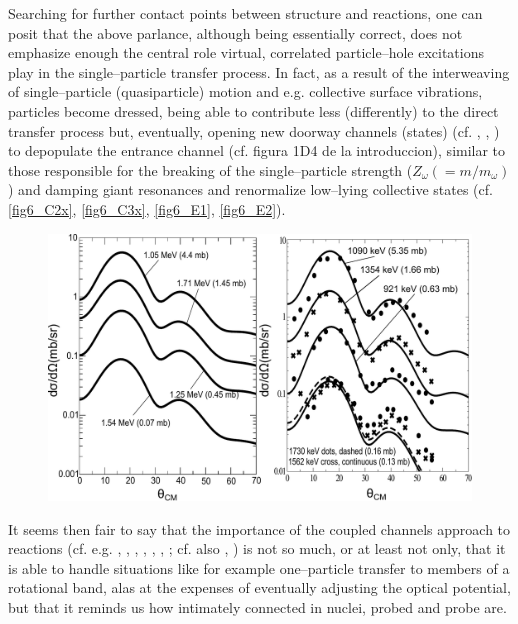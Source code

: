 \documentclass[a4paper,11pt]{book}
\numberwithin{equation}{section}
\numberwithin{figure}{section}
\numberwithin{table}{section}
\begin{document}
Searching for further contact points between structure and reactions, one can posit that the above parlance, although being essentially correct, does not emphasize enough the central role virtual, correlated particle--hole excitations play in the single--particle transfer process. In fact, as a result of the interweaving of single--particle (quasiparticle) motion and e.g. collective surface vibrations, particles become dressed, being able to contribute less (differently) to the direct transfer process but, eventually, opening new doorway channels (states) (cf. \cite{Feshbach:58}, \cite{Rawitscher:87}, \cite{Bortignon:81b}) to depopulate the entrance channel (cf. figura 1D4 de la introduccion), similar to those responsible for the breaking of the single--particle strength ($Z_\omega(=m/m_\omega)$) and damping giant resonances and renormalize low--lying collective 	states (cf. \ref{fig6_C2x}, \ref{fig6_C3x}, \ref{fig6_E1}, \ref{fig6_E2}).
  \begin{figure}
  \centerline{\includegraphics*[width=\textwidth,angle=0]{figs_C6/cross_teor_exp.pdf}}
  \caption{}\label{fig6.2.3}
  \end{figure}

It seems then fair to say that the importance of the coupled channels approach to reactions (cf. e.g. \cite{Thompson:88}, \cite{Thompson:13}, \cite{Tamura:70}, \cite{Ascuitto:69}, \cite{Ascuitto:70}, \cite{Ascuitto:71}, \cite{Ascuitto:72}; cf. also \cite{Fernandez:10}, \cite{Fernandez:10b}) is not so much, or at least not only, that it is able to handle situations like for example one--particle transfer to members of a rotational band, alas at the expenses of eventually adjusting the optical potential, but that it reminds us how intimately connected in nuclei, probed and probe are.
\end{document}
